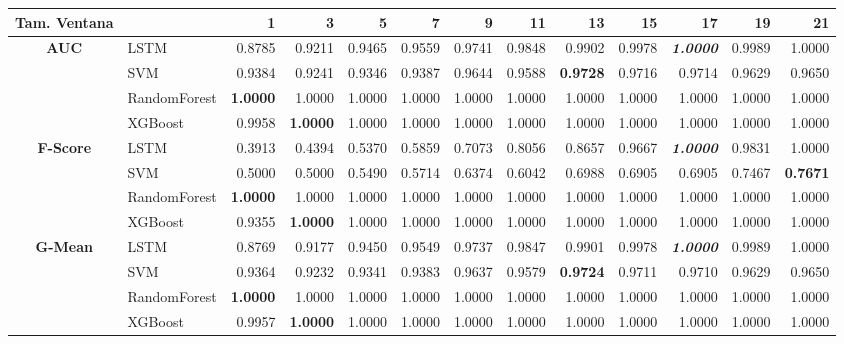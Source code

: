 \begin{table}[H]
\centering
\begin{adjustbox}{max width=12cm}
	\begin{tabular}{|c|l|r|r|r|r|r|r|r|r|r|r|r|}
		\hline
		\textbf{Tam. Ventana} &         &      1  &      3  &      5  &      7  &      9  &      11 &      13 &      15 &      17 &      19 &      21 \\
		\hline
		\textbf{AUC} &  LSTM &  0.8785 &  0.9211 &  0.9465 &  0.9559 &  0.9741 &  0.9848 &  0.9902 &  0.9978 & \textit{ \textbf{  1.0000 } } &  0.9989 &  1.0000 \\
		&  SVM &  0.9384 &  0.9241 &  0.9346 &  0.9387 &  0.9644 &  0.9588 & \textbf{  0.9728 } &  0.9716 &  0.9714 &  0.9629 &  0.9650 \\
		&  RandomForest & \textbf{  1.0000 } &  1.0000 &  1.0000 &  1.0000 &  1.0000 &  1.0000 &  1.0000 &  1.0000 &  1.0000 &  1.0000 &  1.0000 \\
		&  XGBoost &  0.9958 & \textbf{  1.0000 } &  1.0000 &  1.0000 &  1.0000 &  1.0000 &  1.0000 &  1.0000 &  1.0000 &  1.0000 &  1.0000 \\
		\hline
		\textbf{F-Score} &  LSTM &  0.3913 &  0.4394 &  0.5370 &  0.5859 &  0.7073 &  0.8056 &  0.8657 &  0.9667 & \textit{ \textbf{  1.0000 } } &  0.9831 &  1.0000 \\
		&  SVM &  0.5000 &  0.5000 &  0.5490 &  0.5714 &  0.6374 &  0.6042 &  0.6988 &  0.6905 &  0.6905 &  0.7467 & \textbf{  0.7671 } \\
		&  RandomForest & \textbf{  1.0000 } &  1.0000 &  1.0000 &  1.0000 &  1.0000 &  1.0000 &  1.0000 &  1.0000 &  1.0000 &  1.0000 &  1.0000 \\
		&  XGBoost &  0.9355 & \textbf{  1.0000 } &  1.0000 &  1.0000 &  1.0000 &  1.0000 &  1.0000 &  1.0000 &  1.0000 &  1.0000 &  1.0000 \\
		\hline
		\textbf{G-Mean} &  LSTM &  0.8769 &  0.9177 &  0.9450 &  0.9549 &  0.9737 &  0.9847 &  0.9901 &  0.9978 & \textit{ \textbf{  1.0000 } } &  0.9989 &  1.0000 \\
		&  SVM &  0.9364 &  0.9232 &  0.9341 &  0.9383 &  0.9637 &  0.9579 & \textbf{  0.9724 } &  0.9711 &  0.9710 &  0.9629 &  0.9650 \\
		&  RandomForest & \textbf{  1.0000 } &  1.0000 &  1.0000 &  1.0000 &  1.0000 &  1.0000 &  1.0000 &  1.0000 &  1.0000 &  1.0000 &  1.0000 \\
		&  XGBoost &  0.9957 & \textbf{  1.0000 } &  1.0000 &  1.0000 &  1.0000 &  1.0000 &  1.0000 &  1.0000 &  1.0000 &  1.0000 &  1.0000 \\

\end{tabular}
\end{adjustbox}
\end{table}
